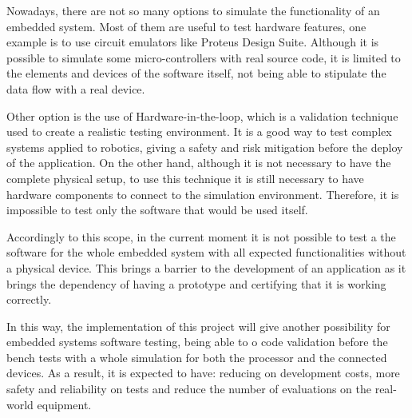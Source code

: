 \documentclass[../../monografia.tex]{subfiles}
\begin{document}

Nowadays, there are not so many options to simulate the functionality of an embedded system. Most of them are useful to test hardware features, one example is to use circuit emulators like Proteus Design Suite. Although it is possible to simulate some micro-controllers with real source code, it is limited to the  elements and devices of the software itself, not being able to stipulate the data flow with a real device.

Other option is the use of Hardware-in-the-loop, which is a validation technique used to create a realistic testing environment. It is a good way to test complex systems applied to robotics, giving a safety and risk mitigation before the deploy of the application. On the other hand, although it is not necessary to have the complete physical setup, to use this technique it is still necessary to have hardware components to connect to the simulation environment. Therefore, it is impossible to test only the software that would be used itself.

Accordingly to this scope, in the current moment it is not possible to test a the software for the whole embedded system with all expected functionalities without a physical device. This brings a barrier to the development of an application as it brings the dependency of having a prototype and certifying that it is working correctly.

In this way, the implementation of this project will give another possibility for embedded systems software testing, being able to o code validation before the bench tests with a whole simulation for both the processor and the connected devices. As a result, it is expected to have: reducing on development costs, more safety and reliability on tests and reduce the number of evaluations on the real-world equipment.
 
\end{document}
